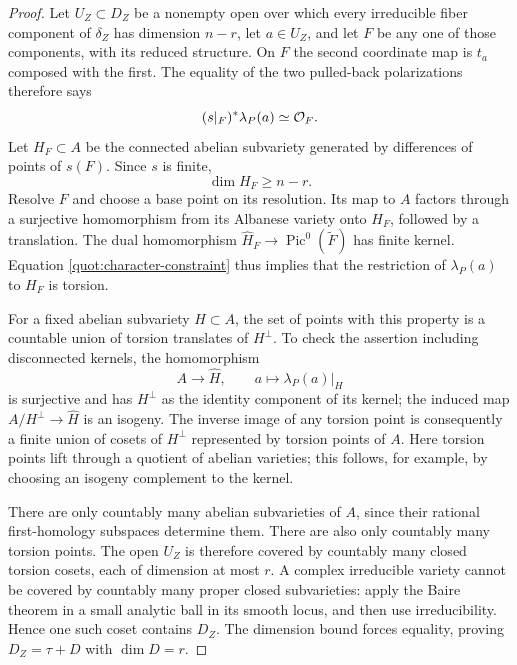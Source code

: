\begin{proof}
Let \(U_Z\subset D_Z\) be a nonempty open over which every
irreducible fiber component of \(\delta_Z\) has dimension \(n-r\),
let \(a\in U_Z\), and let \(F\) be any one of those components,
with its reduced structure.  On \(F\) the second coordinate map is \(t_a\) composed
with the first.  The equality of the two pulled-back polarizations
therefore says
\begin{equation}\label{quot:character-constraint}
                     (s|_F)^*\lambda_P(a)\simeq\mathcal O_F .
\end{equation}
Let \(H_F\subset A\) be the connected abelian subvariety generated
by differences of points of \(s(F)\).  Since \(s\) is finite,
\[
                             \dim H_F\ge n-r.
\]
Resolve \(F\) and choose a base point on its resolution.
Its map to \(A\) factors through a surjective homomorphism from its
Albanese variety onto \(H_F\), followed by a translation.
The dual homomorphism
\(\widehat H_F\to\operatorname{Pic}^0(\widetilde F)\)
has finite kernel.  Equation \eqref{quot:character-constraint}
thus implies that the restriction of \(\lambda_P(a)\) to \(H_F\)
is torsion.

For a fixed abelian subvariety \(H\subset A\), the set of points with
this property is a countable union of torsion translates of
\(H^\perp\).  To check the assertion including disconnected kernels,
the homomorphism
\[
                      A\longrightarrow\widehat H,\qquad
                      a\longmapsto\lambda_P(a)|_H
\]
is surjective and has \(H^\perp\) as the identity component of its kernel;
the induced map \(A/H^\perp\to\widehat H\) is an isogeny.
The inverse image of any torsion point is consequently a finite
union of cosets of \(H^\perp\) represented by torsion points of \(A\).
Here torsion points lift through a quotient of abelian varieties;
this follows, for example, by choosing an isogeny complement to
the kernel.

There are only countably many abelian subvarieties of \(A\), since
their rational first-homology subspaces determine them.
There are also only countably many torsion points.
The open \(U_Z\) is therefore covered by countably many
closed torsion cosets, each of dimension at most \(r\).
A complex irreducible variety cannot be covered by countably many
proper closed subvarieties: apply the Baire theorem in a small
analytic ball in its smooth locus, and then use irreducibility.
Hence one such coset contains \(D_Z\).
The dimension bound forces equality, proving
\(D_Z=\tau+D\) with \(\dim D=r\).


\end{proof}
